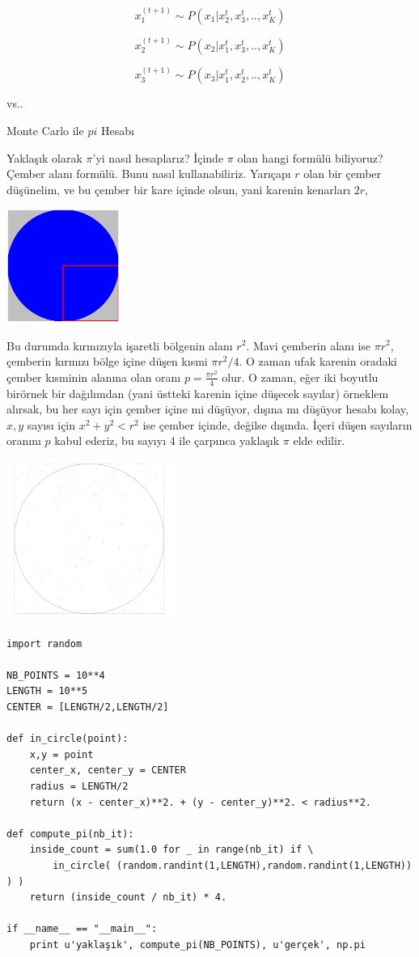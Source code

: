 \documentclass[12pt,fleqn]{article}\usepackage{../../common}
\begin{document}
$$ x_1^{(t+1)} \sim P(x_1 | x_2^{t},x_3^{t},..,x_K^{t}) $$ 

$$ x_2^{(t+1)} \sim P(x_2 | x_1^{t},x_3^{t},..,x_K^{t}) $$ 

$$ x_3^{(t+1)} \sim P(x_3 | x_1^{t},x_2^{t},..,x_K^{t}) $$ 

vs..

Monte Carlo ile $pi$ Hesabı

Yaklaşık olarak $\pi$'yi nasıl hesaplarız? İçinde $\pi$ olan hangi formülü
biliyoruz? Çember alanı formülü. Bunu nasıl kullanabiliriz. Yarıçapı $r$
olan bir çember düşünelim, ve bu çember bir kare içinde olsun, yani karenin
kenarları $2r$,

\includegraphics[width=10em]{stat_mcmc_05.png}

Bu durumda kırmızıyla işaretli bölgenin alanı $r^2$. Mavi çemberin alanı
ise $\pi r^2$, çemberin kırmızı bölge içine düşen kısmi $\pi r^2 / 4$. O
zaman ufak karenin oradaki çember kısminin alanına olan oranı
$p = \frac{\pi r^2}{4}$ olur. O zaman, eğer iki boyutlu birörnek bir
dağılımdan (yani üstteki karenin içine düşecek sayılar) örneklem alırsak,
bu her sayı için çember içine mi düşüyor, dışına mı düşüyor hesabı kolay,
$x,y$ sayısı için $x^2+y^2 < r^2$ ise çember içinde, değilse dışında. İçeri
düşen sayıların oranını $p$ kabul ederiz, bu sayıyı 4 ile çarpınca yaklaşık
$\pi$ elde edilir.

\includegraphics[width=15em]{stat_mcmc_04.png}

\begin{verbatim}
import random

NB_POINTS = 10**4
LENGTH = 10**5
CENTER = [LENGTH/2,LENGTH/2]

def in_circle(point):
    x,y = point
    center_x, center_y = CENTER
    radius = LENGTH/2
    return (x - center_x)**2. + (y - center_y)**2. < radius**2.

def compute_pi(nb_it):
    inside_count = sum(1.0 for _ in range(nb_it) if \
        in_circle( (random.randint(1,LENGTH),random.randint(1,LENGTH)) ) )
    return (inside_count / nb_it) * 4.

if __name__ == "__main__":
    print u'yaklaşık', compute_pi(NB_POINTS), u'gerçek', np.pi
\end{verbatim}
\end{document}

